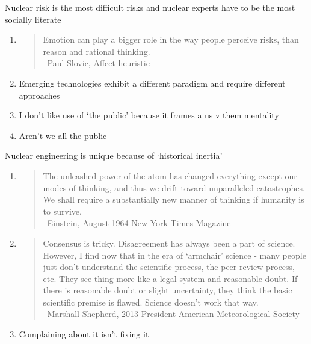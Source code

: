 \documentclass[aspectratio=1610,pdftex,dvipsnames,compress,xcolor={dvipsnames}]{beamer}
\begin{document}
\begin{frame}{Nuclear risk is the most difficult risks and nuclear experts have to be the most socially literate}
    \begin{enumerate}[series=outerlist,topsep=0pt,itemsep=21pt,leftmargin=*,label=(\arabic*)]
        \item[]
            \begin{quote}
                Emotion can play a bigger role in the way people perceive risks, than reason and rational thinking.\\
                --Paul Slovic, Affect heuristic
            \end{quote}
        \item[]Emerging technologies exhibit a different paradigm and require different approaches
        \item[]I don't like use of `the public' because it frames a us v them mentality
        \item[]Aren't we all the public
    \end{enumerate}
\end{frame}


\begin{frame}{Nuclear engineering is unique because of `historical inertia'}
    \begin{enumerate}[series=outerlist,topsep=0pt,itemsep=21pt,leftmargin=*,label=(\arabic*)]
        \item[]
            \begin{quote}
                The unleashed power of the atom has changed everything except our modes of thinking, and thus we drift toward unparalleled catastrophes. We shall require a substantially new manner of thinking if humanity is to survive.\\
                --Einstein, August 1964 New York Times Magazine
            \end{quote}
        \item[]
            \begin{quote}
                Consensus is tricky. Disagreement has always been a part of science. However, I find now that in the era of `armchair' science - many people just don't understand the scientific process, the peer-review process, etc. They see thing more like a legal system and reasonable doubt. If there is reasonable doubt or slight uncertainty, they think the basic scientific premise is flawed. Science doesn't work that way.\\
                --Marshall Shepherd, 2013 President American Meteorological Society
            \end{quote}
        \item[]Complaining about it isn't fixing it
    \end{enumerate}
\end{frame}
\end{document}
